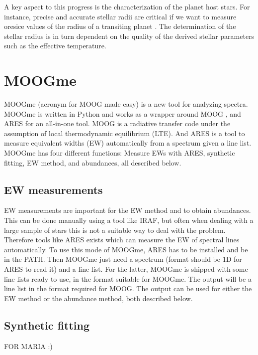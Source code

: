 \documentclass{aa}
\begin{document}
A key aspect to this progress is the characterization of the planet host stars.
For instance, precise and accurate stellar radii are critical if we want to
measure oresice values of the radius of a transiting planet
\citep[see e.g.][]{Torres2012}. The determination of the stellar radius
is in turn dependent on the quality of the derived stellar parameters such as
the effective temperature.



\section{MOOGme}
\label{sec:MOOGme}

MOOGme (acronym for MOOG made easy) is a new tool for analyzing spectra.
MOOGme is written in Python and works as a wrapper around MOOG
\citep{Sneden1973}, and ARES \citep{Sousa2015a} for an all-in-one tool.
MOOG is a radiative transfer code under the assumption of local
thermodynamic equilibrium (LTE). And ARES is a tool to measure equivalent
widths (EW) automatically from a spectrum given a line list. MOOGme has
four different functions: Measure EWs with ARES, synthetic fitting, EW method,
and abundances, all described below.

\subsection{EW measurements}
\label{sub:EW_measurements}
EW measurements are important for the EW method and to obtain abundances. This
can be done manually using a tool like IRAF, but often when dealing with a large
sample of stars this is not a suitable way to deal with the problem. Therefore
tools like ARES exists which can measure the EW of spectral lines automatically.
To use this mode of MOOGme, ARES has to be installed and be in the PATH. Then
MOOGme just need a spectrum (format should be 1D for ARES to read it) and a line
list. For the latter, MOOGme is shipped with some line lists ready to use, in
the format suitable for MOOGme. The output will be a line list in the format
required for MOOG. The output can be used for either the EW method or the
abundance method, both described below.


\subsection{Synthetic fitting}
\label{sub:Synthetic_fitting}

FOR MARIA :)
\end{document}

